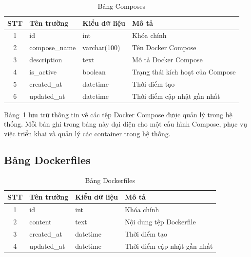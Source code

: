 \documentclass[../DoAn.tex]{subfiles}
\begin{document}
\begin{table}[H]
\centering
\begin{tabular}{|c|l|l|l|}
\hline
\textbf{STT} & \textbf{Tên trường}   & \textbf{Kiểu dữ liệu} & \textbf{Mô tả}                              \\ \hline
1            & id                    & int                  & Khóa chính\\ \hline
2            & compose\_name         & varchar(100)         & Tên Docker Compose                      \\ \hline
3            & description           & text                 & Mô tả Docker Compose                    \\ \hline
4            & is\_active            & boolean              & Trạng thái kích hoạt của Compose            \\ \hline
5            & created\_at           & datetime             & Thời điểm tạo                               \\ \hline
6            & updated\_at           & datetime             & Thời điểm cập nhật gần nhất                 \\ \hline
\end{tabular}
\caption{Bảng Composes}
\label{tab:composes}
\end{table}

Bảng~\ref{tab:composes} lưu trữ thông tin về các tệp Docker Compose được quản lý trong hệ thống. Mỗi bản ghi trong bảng này đại diện cho một cấu hình Compose, phục vụ việc triển khai và quản lý các container trong hệ thống.

\subsection{Bảng Dockerfiles}

\begin{table}[H]
\centering
\begin{tabular}{|c|l|l|l|}
\hline
\textbf{STT} & \textbf{Tên trường}   & \textbf{Kiểu dữ liệu} & \textbf{Mô tả}                              \\ \hline
1            & id                    & int                  & Khóa chính                   \\ \hline
2            & content               & text                 & Nội dung tệp Dockerfile                     \\ \hline
3            & created\_at           & datetime             & Thời điểm tạo                               \\ \hline
4            & updated\_at           & datetime             & Thời điểm cập nhật gần nhất                 \\ \hline
\end{tabular}
\caption{Bảng Dockerfiles}
\label{tab:dockerfiles}
\end{table}
\end{document}
